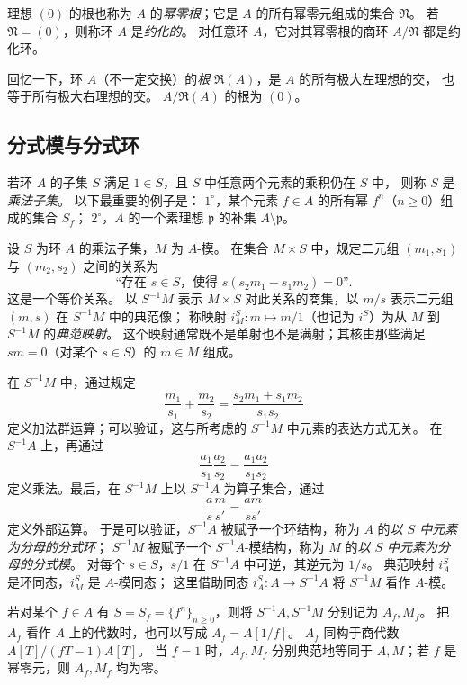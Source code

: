 理想 $(0)$ 的根也称为 $A$ 的\emph{幂零根}；它是 $A$ 的所有幂零元组成的集合 $\mathfrak N$。
若 $\mathfrak N=(0)$，则称环 $A$ 是\emph{约化的}。
对任意环 $A$，它对其幂零根的商环 $A/\mathfrak N$ 都是约化环。

回忆一下，环 $A$（不一定交换）的\emph{根} $\mathfrak R(A)$，是 $A$ 的所有极大左理想的交，
也等于所有极大右理想的交。
$A/\mathfrak R(A)$ 的根为 $(0)$。

\subsection{分式模与分式环}\hypertarget{heading:0:1.2}{}

若环 $A$ 的子集 $S$ 满足 $1\in S$，且 $S$ 中任意两个元素的乘积仍在 $S$ 中，
则称 $S$ 是\emph{乘法子集}。
以下最重要的例子是：
$1^\circ$，某个元素 $f\in A$ 的所有幂 $f^n$（$n\ge0$）组成的集合 $S_f$；
$2^\circ$，$A$ 的一个素理想 $\mathfrak p$ 的补集 $A\setminus\mathfrak p$。

设 $S$ 为环 $A$ 的乘法子集，$M$ 为 $A$-模。
在集合 $M\times S$ 中，规定二元组 $(m_1,s_1)$ 与 $(m_2,s_2)$ 之间的关系为
\[
 \text{“存在 }s\in S\text{，使得 }s(s_2m_1-s_1m_2)=0\text{”}.
\]
这是一个等价关系。
以 $S^{-1}M$ 表示 $M\times S$ 对此关系的商集，以 $m/s$ 表示二元组 $(m,s)$ 在 $S^{-1}M$ 中的典范像；
称映射 $i_M^S\colon m\mapsto m/1$（也记为 $i^S$）为从 $M$ 到 $S^{-1}M$ 的\emph{典范映射}。
这个映射通常既不是单射也不是满射；其核由那些满足 $sm=0$（对某个 $s\in S$）的 $m\in M$ 组成。

在 $S^{-1}M$ 中，通过规定
\[
 \frac{m_1}{s_1}+\frac{m_2}{s_2}
 =\frac{s_2m_1+s_1m_2}{s_1s_2}
\]
定义加法群运算；可以验证，这与所考虑的 $S^{-1}M$ 中元素的表达方式无关。
在 $S^{-1}A$ 上，再通过
\[
 \frac{a_1}{s_1}\frac{a_2}{s_2}=\frac{a_1a_2}{s_1s_2}
\]
定义乘法。最后，在 $S^{-1}M$ 上以 $S^{-1}A$ 为算子集合，通过
\[
 \frac a s\frac m{s'}=\frac{am}{ss'}
\]
定义外部运算。
于是可以验证，$S^{-1}A$ 被赋予一个环结构，称为 $A$ 的\emph{以 $S$ 中元素为分母的分式环}；
$S^{-1}M$ 被赋予一个 $S^{-1}A$-模结构，称为 $M$ 的\emph{以 $S$ 中元素为分母的分式模}。
对每个 $s\in S$，$s/1$ 在 $S^{-1}A$ 中可逆，其逆元为 $1/s$。
典范映射 $i_A^S$ 是环同态，$i_M^S$ 是 $A$-模同态；
这里借助同态 $i_A^S\colon A\to S^{-1}A$ 将 $S^{-1}M$ 看作 $A$-模。

若对某个 $f\in A$ 有 $S=S_f=\{f^n\}_{n\ge0}$，则将 $S^{-1}A,S^{-1}M$ 分别记为 $A_f,M_f$。
把 $A_f$ 看作 $A$ 上的代数时，也可以写成 $A_f=A[1/f]$。
$A_f$ 同构于商代数 $A[T]/(fT-1)A[T]$。
当 $f=1$ 时，$A_f,M_f$ 分别典范地等同于 $A,M$；若 $f$ 是幂零元，则 $A_f,M_f$ 均为零。

